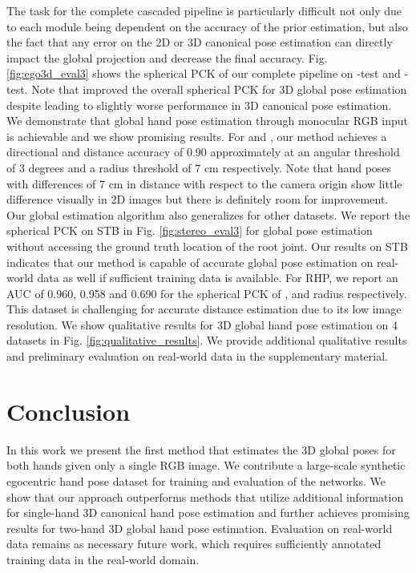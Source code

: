 \documentclass[10pt,twocolumn,letterpaper]{article}
\begin{document}
\indent The task for the complete cascaded pipeline is particularly difficult not only due to each module being dependent on the accuracy of the prior estimation, but also the fact that any error on the 2D or 3D canonical pose estimation can directly impact the global projection and decrease the final accuracy. Fig. \ref{fig:ego3d_eval3} shows the spherical PCK of our complete pipeline on -test and -test. Note that  improved the overall spherical PCK for 3D global pose estimation despite leading to slightly worse performance in 3D canonical pose estimation.\\
\indent We demonstrate that global hand pose estimation through monocular RGB input is achievable and we show promising results. For  and , our method achieves a directional and distance accuracy of 0.90 approximately at an angular threshold of 3 degrees and a radius threshold of 7 cm respectively. Note that hand poses with differences of 7 cm in distance with respect to the camera origin show little difference visually in 2D images but there is definitely room for improvement. \\
\indent Our global estimation algorithm also generalizes for other datasets. We report the spherical PCK on STB in Fig. \ref{fig:stereo_eval3} for global pose estimation without accessing the ground truth location of the root joint. Our results on STB indicates that our method is capable of accurate global pose estimation on real-world data as well if sufficient training data is available. For RHP, we report an AUC of 0.960, 0.958 and 0.690 for the spherical PCK of ,  and radius respectively. This dataset is challenging for accurate distance estimation due to its low image resolution. We show qualitative results for 3D global hand pose estimation on 4 datasets in Fig. \ref{fig:qualitative_results}. We provide additional qualitative results and preliminary evaluation on real-world data in the supplementary material.
\section{Conclusion}
\indent In this work we present the first method that estimates the 3D global poses for both hands given only a single RGB image. We contribute a large-scale synthetic egocentric hand pose dataset for training and evaluation of the networks. We show that our approach outperforms methods that utilize additional information for single-hand 3D canonical hand pose estimation and further achieves promising results for two-hand 3D global hand pose estimation. Evaluation on real-world data remains as necessary future work, which requires sufficiently annotated training data in the real-world domain. 
\end{document}

